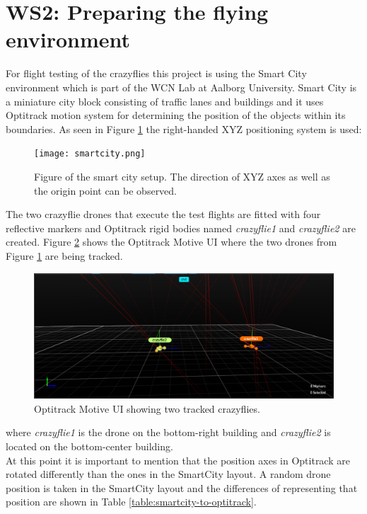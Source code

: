 \section{WS2: Preparing the flying environment}

For flight testing of the crazyflies this project is using the Smart City environment which is part of the WCN Lab at Aalborg University. Smart City is a miniature city block consisting of traffic lanes and buildings and it uses Optitrack motion system for determining the position of the objects within its boundaries. As seen in Figure \ref{figure:smart_city_layout} the right-handed XYZ positioning system is used:

\begin{figure}[H]
\centering
 \texttt{[image: smartcity.png]}
 \caption{Figure of the smart city setup. The direction of XYZ axes as well as the origin point can be observed.}
 \label{figure:smart_city_layout}
\end{figure}

The two crazyflie drones that execute the test flights are fitted with four reflective markers and Optitrack rigid bodies named \textit{crazyflie1} and \textit{crazyflie2} are created. Figure \ref{figure:optitrack_ui} shows the Optitrack Motive UI where the two drones from Figure \ref{figure:smart_city_layout} are being tracked.

\begin{figure}[H]
\centering
 \includegraphics[width=\textwidth]{Figures/optitrack_ui.png}
 \caption{Optitrack Motive UI showing two tracked crazyflies.}
 \label{figure:optitrack_ui}
\end{figure}

\noindent where \textit{crazyflie1} is the drone on the bottom-right building and \textit{crazyflie2} is located on the bottom-center building.\\
\noindent At this point it is important to mention that the position axes in Optitrack are rotated differently than the ones in the SmartCity layout. A random drone position is taken in the SmartCity layout and the differences of representing that position are shown in Table \ref{table:smartcity-to-optitrack}.

